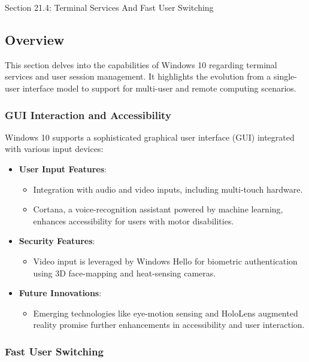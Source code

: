 \begin{notes}{Section 21.4: Terminal Services And Fast User Switching}
    \subsection*{Overview}

    This section delves into the capabilities of Windows 10 regarding terminal services and user session management. It highlights the evolution from a single-user interface model to support for 
    multi-user and remote computing scenarios.
    
    \subsubsection*{GUI Interaction and Accessibility}
    
    Windows 10 supports a sophisticated graphical user interface (GUI) integrated with various input devices:
    \begin{itemize}
        \item \textbf{User Input Features}:
        \begin{itemize}
            \item Integration with audio and video inputs, including multi-touch hardware.
            \item Cortana, a voice-recognition assistant powered by machine learning, enhances accessibility for users with motor disabilities.
        \end{itemize}
        \item \textbf{Security Features}:
        \begin{itemize}
            \item Video input is leveraged by Windows Hello for biometric authentication using 3D face-mapping and heat-sensing cameras.
        \end{itemize}
        \item \textbf{Future Innovations}:
        \begin{itemize}
            \item Emerging technologies like eye-motion sensing and HoloLens augmented reality promise further enhancements in accessibility and user interaction.
        \end{itemize}
    \end{itemize}
    
    \subsubsection*{Fast User Switching}
    

\end{notes}

